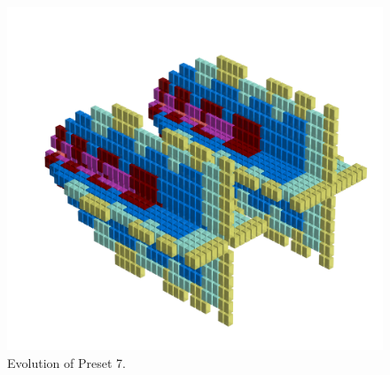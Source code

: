 \clearpage                                                                 
\begin{figure}[H]                                                          
  \centering                                                             
  \begin{adjustbox}{width=14cm,center}                                   
  \includegraphics[width=14cm]{src/presets/pattern7-45.png}%
  \end{adjustbox}                                                        
\caption{Evolution of Preset 7.}                                           
\end{figure}                                                               
\clearpage                                                                 
                                                                           
